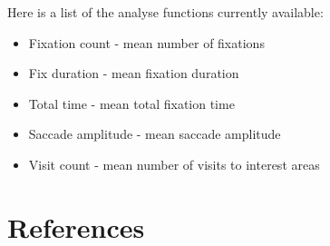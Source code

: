 \documentclass[]{book}
\providecommand{\tightlist}{%
  \setlength{\itemsep}{0pt}\setlength{\parskip}{0pt}}
\begin{document}
Here is a list of the analyse functions currently available:

\begin{itemize}
\tightlist
\item
  Fixation count - mean number of fixations
\item
  Fix duration - mean fixation duration
\item
  Total time - mean total fixation time
\item
  Saccade amplitude - mean saccade amplitude
\item
  Visit count - mean number of visits to interest areas
\end{itemize}

\hypertarget{references}{%
\chapter{References}\label{references}}


\end{document}
